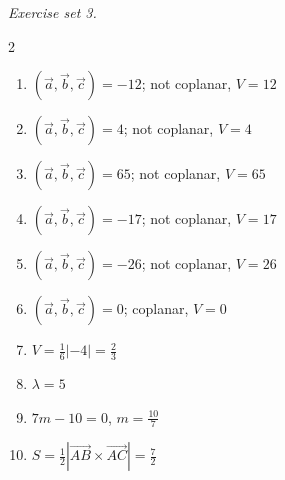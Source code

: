 \par\noindent\emph{Exercise set 3.}\nopagebreak
\begin{multicols}{2}\raggedright
\begin{enumerate}[label=\arabic*., leftmargin=*, itemsep=1pt]
\item $(\vec a,\vec b,\vec c)=-12$; not coplanar, $V=12$
\item $(\vec a,\vec b,\vec c)=4$; not coplanar, $V=4$
\item $(\vec a,\vec b,\vec c)=65$; not coplanar, $V=65$
\item $(\vec a,\vec b,\vec c)=-17$; not coplanar, $V=17$
\item $(\vec a,\vec b,\vec c)=-26$; not coplanar, $V=26$
\item $(\vec a,\vec b,\vec c)=0$; coplanar, $V=0$
\item $V=\frac16|-4|=\frac{2}{3}$
\item $\lambda=5$
\item $7m-10=0$, $m=\frac{10}{7}$
\item $S=\frac12|\overrightarrow{AB}\times\overrightarrow{AC}|=\frac72$
\end{enumerate}
\end{multicols}
